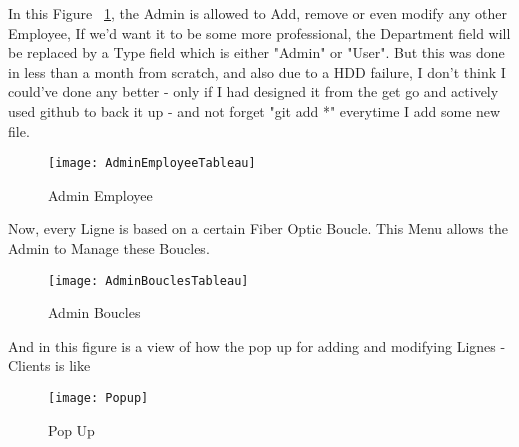In this Figure ~\ref{fig:AdminEmployeeTable}, the Admin is allowed to Add, remove or even modify any other Employee, If we'd want it to be some more professional, the Department field will be replaced by a Type field which is either "Admin" or "User". But this was done in less than a month from scratch, and also due to a HDD failure, I don't think I could've done any better - only if I had designed it from the get go and actively used github to back it up - and not forget "git add *" everytime I add some new file.
\begin{figure}[ht!] %
  \centering
  \texttt{[image: AdminEmployeeTableau]}
  \caption[AdminEmployeeTable]{Admin Employee}%
  \label{fig:AdminEmployeeTable}
\end{figure}

Now, every Ligne is based on a certain Fiber Optic Boucle. This Menu allows the Admin to Manage these Boucles.
\begin{figure}[ht!] %
  \centering
  \texttt{[image: AdminBouclesTableau]}
  \caption[AdminBouclesTable]{Admin Boucles}%
  \label{fig:AdminBouclesTable}
\end{figure}


And in this figure is a view of how the pop up for adding and modifying Lignes - Clients is like
\begin{figure}[ht!] %
  \centering
  \texttt{[image: Popup]}
  \caption[Client Pop Up]{Pop Up}%
  \label{fig:Popup}
\end{figure}
